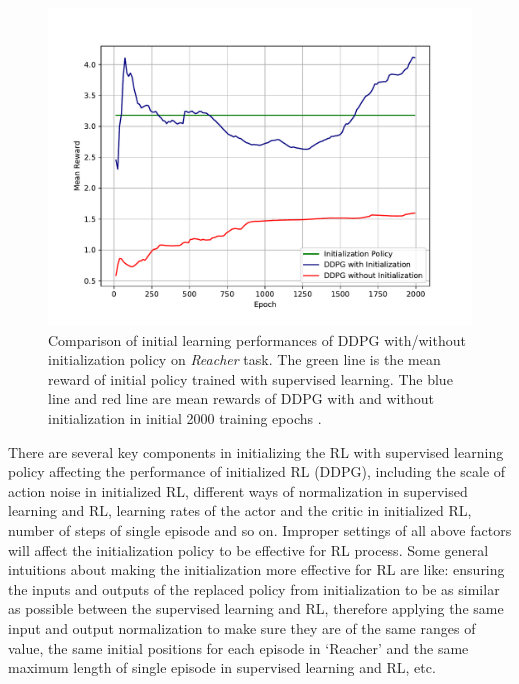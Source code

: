\documentclass{article}
\begin{document}
\begin{figure}[htbp]
	\centering
	\includegraphics[scale=0.8]{img/ddpg_compare1.pdf}
	\caption{Comparison of initial learning performances of DDPG with/without initialization policy on \textit{Reacher} task. The green line is the mean reward of initial policy trained with supervised learning. The blue line and red line are mean rewards of DDPG with and without initialization in initial 2000 training epochs . }
	\label{fig:universe}
\end{figure}

There are several key components in initializing the RL with supervised learning policy affecting the performance of initialized RL (DDPG), including the scale of action noise in initialized RL, different ways of normalization in supervised learning and RL, learning rates of the actor and the critic in initialized RL, number of steps of single episode and so on. Improper settings of all above factors will affect the initialization policy to be effective for RL process. Some general intuitions about making the initialization more effective for RL are like: ensuring the inputs and outputs of the replaced policy from initialization to be as similar as possible between the supervised learning and RL, therefore applying the same input and output normalization to make sure they are of the same ranges of value, the same initial positions for each episode in `Reacher' and the same maximum length of single episode in supervised learning and RL, etc. 
\end{document}
